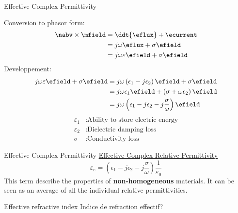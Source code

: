 \begin{frame}{Effective Complex Permittivity}
    \begin{twocolumns}[0.5]
     \leftcol
         Conversion to phasor form:
        \begin{equation*}
            \begin{aligned}
                \nabv \times \mfield &= \ddt{\eflux} + \ecurrent \\
                &= j\omega \eflux + \sigma \efield\\
                &= j\omega \varepsilon \efield + \sigma \efield\\
            \end{aligned}
        \end{equation*}
            Developpement:
        \begin{equation*}
            \begin{aligned}
                j\omega \varepsilon \efield + \sigma \efield &= j\omega \left(\epsilon_1 - j \epsilon_2\right)\efield + \sigma \efield \\
                &= j\omega \epsilon_1 \efield +  \left( \sigma + \omega \epsilon_2 \right)\efield \\
                &= j\omega \left(\epsilon_1 - j \epsilon_2 - j \frac{\sigma}{\omega}\right)\efield\\
            \end{aligned}
        \end{equation*}
    \rightcol
        \begin{equation*}
            \begin{aligned}
                \varepsilon_1 &: \text{Ability to store electric energy}\\
                \varepsilon_2 &: \text{Dielectric damping loss}\\
                \sigma &: \text{Conductivity loss}
            \end{aligned}
        \end{equation*}
    \end{twocolumns}
\end{frame}

\begin{frame}{Effective Complex Permittivity}
    \centering
    \underline{Effective Complex Relative Permittivity}
    \begin{equation}
        \varepsilon_e = \left(\epsilon_1 - j\epsilon_2 - j\frac{\sigma}{\omega}\right)\frac{1}{\varepsilon_0}
    \end{equation}
    This term describe the properties of \textbf{non-homogeneous} materials. It can be seen as an average of all the individual relative permittivities.

\end{frame}

\begin{frame}{Effective refractive index}
    Indice de refraction effectif?
\end{frame}

